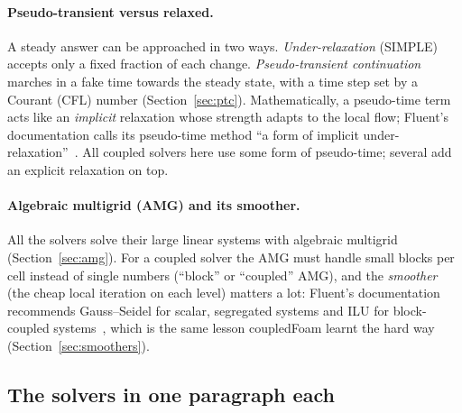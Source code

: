 \paragraph{Pseudo-transient versus relaxed.} A steady answer can be
approached in two ways. \emph{Under-relaxation} (SIMPLE) accepts only a
fixed fraction of each change. \emph{Pseudo-transient continuation}
marches in a fake time towards the steady state, with a time step set by a
Courant (CFL) number (Section~\ref{sec:ptc}). Mathematically, a pseudo-time
term acts like an \emph{implicit} relaxation whose strength adapts to the
local flow; Fluent's documentation calls its pseudo-time method ``a form of
implicit under-relaxation''~\cite{cmp-FluentPseudoTime}. All coupled
solvers here use some form of pseudo-time; several add an explicit
relaxation on top.

\paragraph{Algebraic multigrid (AMG) and its smoother.} All the solvers
solve their large linear systems with algebraic multigrid
(Section~\ref{sec:amg}). For a coupled solver the AMG must handle small
blocks per cell instead of single numbers (``block'' or ``coupled'' AMG),
and the \emph{smoother} (the cheap local iteration on each level) matters a
lot: Fluent's documentation recommends Gauss--Seidel for scalar,
segregated systems and ILU for block-coupled systems~\cite{cmp-Fluent12UG},
which is the same lesson coupledFoam learnt the hard way
(Section~\ref{sec:smoothers}).

\subsection{The solvers in one paragraph each}\label{sec:cmp-who}


